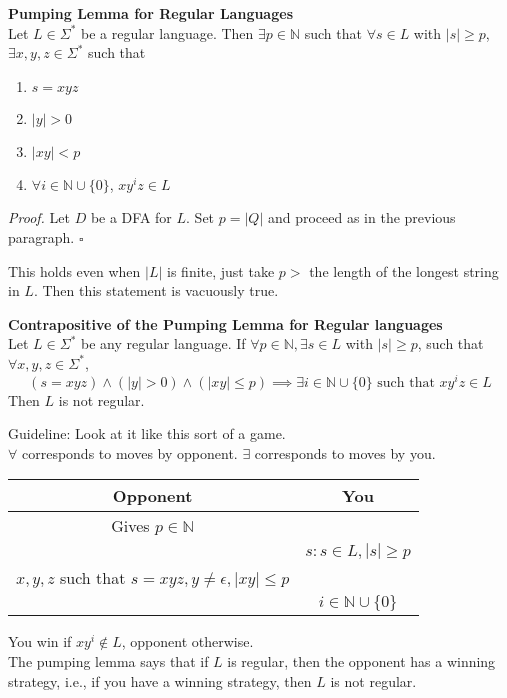 \documentclass[a4paper]{article}
\newenvironment{proof}{\begin{breakbox}\textit{Proof.}}{\hfill$\square$\end{breakbox}}
\newcommand{\nl}{\vspace{0.2cm}\\}
\newcommand{\mb}{\mathbb}
\begin{document}
\begin{lemma}
    \textbf{Pumping Lemma for Regular Languages}\nl
    Let $L \in \Sigma^*$ be a regular language. Then $\exists p \in \mb{N}$ such that $\forall s \in L$ with $|s| \ge p$, $\exists x, y, z \in \Sigma^*$ such that
    \begin{enumerate}
        \item $s = xyz$
        \item $|y| > 0$
        \item $|xy| < p$
        \item $\forall i \in \mb{N} \cup \{0\}$, $xy^iz \in L$
    \end{enumerate}
\end{lemma}
\begin{proof}
    Let $D$ be a DFA for $L$. Set $p = |Q|$ and proceed as in the previous paragraph.
\end{proof}
\begin{note}
    This holds even when $|L|$ is finite, just take $p > $ the length of the longest string in $L$. Then this statement is vacuously true.
\end{note}
\begin{lemma}
    \textbf{Contrapositive of the Pumping Lemma for Regular languages}\nl
    Let $L \in \Sigma^*$ be any regular language. If $\forall p \in \mb{N}, \exists s \in L$ with $|s| \ge p$, such that $\forall x, y, z \in \Sigma^*$,
    $$
    (s = xyz) \land (|y| > 0) \land (|xy| \le p) \implies \exists i \in \mb{N} \cup \{0\} \text{ such that } xy^iz \in L
    $$
    Then $L$ is not regular.
\end{lemma}
\begin{note}
    Guideline: Look at it like this sort of a game.\nl
    $\forall$ corresponds to moves by opponent. $\exists$ corresponds to moves by you.\nl
    \begin{center}
    \begin{tabular}{|c|c|}
        \hline
        Opponent & You  \\
        \hline
        Gives $p \in \mb{N}$ &  \\
        & $s : s \in L, |s| \ge p$ \\
        $x, y, z$ such that $s = xyz, y \ne \epsilon, |xy| \le p$ & \\
        & $i \in \mb{N} \cup \{0\}$\\
        \hline
    \end{tabular}
    \end{center}

    You win if $xy^i \not \in L$, opponent otherwise.\nl

    The pumping lemma says that if $L$ is regular, then the opponent has a winning strategy, i.e., if you have a winning strategy, then $L$ is not regular.
\end{note}
\end{document}
